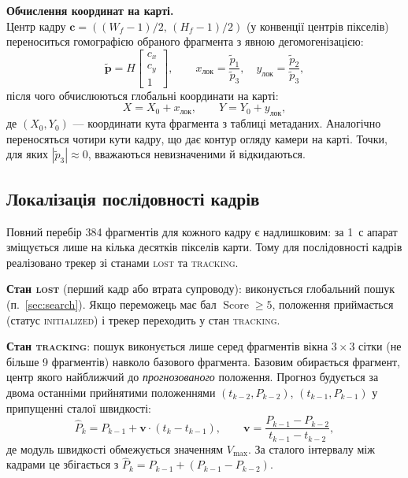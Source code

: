 \documentclass[a4paper, 12pt, titlepage]{article}
\begin{document}
\textbf{Обчислення координат на карті.}\\
Центр кадру $\mathbf{c} = ((W_f - 1)/2,\, (H_f - 1)/2)$ (у конвенції центрів пікселів) переноситься гомографією обраного фрагмента з явною дегомогенізацією:
\begin{equation}
\tilde{\mathbf{p}} = H \begin{bmatrix} c_x \\ c_y \\ 1 \end{bmatrix}, \qquad
x_{\text{лок}} = \frac{\tilde{p}_1}{\tilde{p}_3}, \quad y_{\text{лок}} = \frac{\tilde{p}_2}{\tilde{p}_3},
\end{equation}
після чого обчислюються глобальні координати на карті:
\begin{equation}
X = X_0 + x_{\text{лок}}, \qquad Y = Y_0 + y_{\text{лок}},
\end{equation}
де $(X_0, Y_0)$ --- координати кута фрагмента з таблиці метаданих. Аналогічно переносяться чотири кути кадру, що дає контур огляду камери на карті. Точки, для яких $|\tilde{p}_3| \approx 0$, вважаються невизначеними й відкидаються.

\subsection{Локалізація послідовності кадрів}
\label{sec:tracking}

Повний перебір 384 фрагментів для кожного кадру є надлишковим: за 1~с апарат зміщується лише на кілька десятків пікселів карти. Тому для послідовності кадрів реалізовано трекер зі станами \textsc{lost} та \textsc{tracking}.

\textbf{Стан \textsc{lost}} (перший кадр або втрата супроводу): виконується глобальний пошук (п.~\ref{sec:search}). Якщо переможець має бал $\operatorname{Score} \ge 5$, положення приймається (статус \textsc{initialized}) і трекер переходить у стан \textsc{tracking}.

\textbf{Стан \textsc{tracking}}: пошук виконується лише серед фрагментів вікна $3 \times 3$ сітки (не більше 9 фрагментів) навколо базового фрагмента. Базовим обирається фрагмент, центр якого найближчий до \emph{прогнозованого} положення. Прогноз будується за двома останніми прийнятими положеннями $(t_{k-2}, P_{k-2})$, $(t_{k-1}, P_{k-1})$ у припущенні сталої швидкості:
\begin{equation}
\hat{P}_k = P_{k-1} + \mathbf{v} \cdot (t_k - t_{k-1}), \qquad
\mathbf{v} = \frac{P_{k-1} - P_{k-2}}{t_{k-1} - t_{k-2}},
\label{eq:extrapolation}
\end{equation}
де модуль швидкості обмежується значенням $V_{\max}$. За сталого інтервалу між кадрами це збігається з $\hat{P}_k = P_{k-1} + (P_{k-1} - P_{k-2})$.
\end{document}
